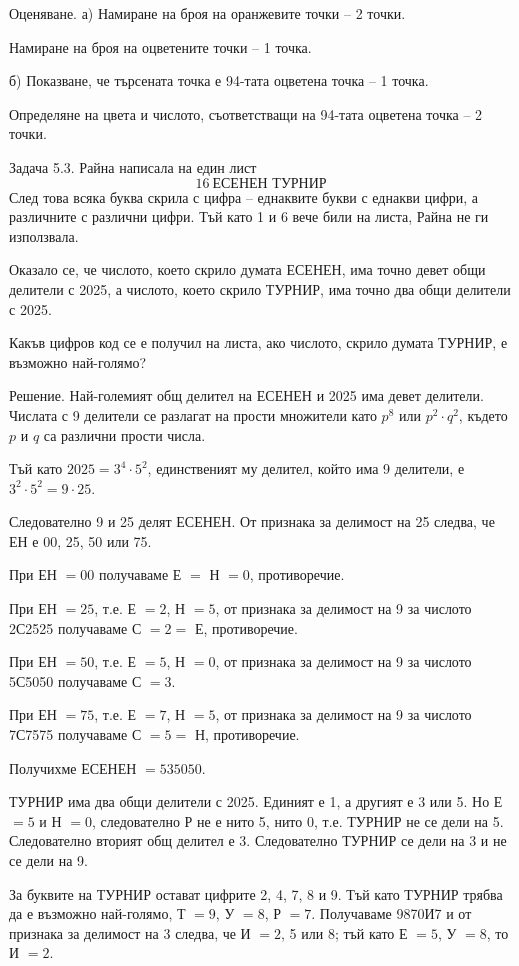 Оценяване. а) Намиране на броя на оранжевите точки – 2 точки.

Намиране на броя на оцветените точки – 1 точка.

б) Показване, че търсената точка е 94-тата оцветена точка – 1 точка.

Определяне на цвета и числото, съответстващи на 94-тата оцветена точка – 2 точки.

Задача 5.3. Райна написала на един лист
$$16\ \text{ЕСЕНЕН ТУРНИР}$$
След това всяка буква скрила с цифра – еднаквите букви с еднакви цифри, а различните с различни цифри. Тъй като 1 и 6 вече били на листа, Райна не ги използвала.

Оказало се, че числото, което скрило думата ЕСЕНЕН, има точно девет общи делители с 2025, а числото, което скрило ТУРНИР, има точно два общи делители с 2025.

Какъв цифров код се е получил на листа, ако числото, скрило думата ТУРНИР, е възможно най-голямо?

Решение. Най-големият общ делител на ЕСЕНЕН и 2025 има девет делители. Числата с 9 делители се разлагат на прости множители като $p^8$ или $p^2\cdot q^2$, където $p$ и $q$ са различни прости числа.

Тъй като $2025=3^4\cdot5^2$, единственият му делител, който има 9 делители, е $3^2\cdot5^2=9\cdot25$.

Следователно 9 и 25 делят ЕСЕНЕН. От признака за делимост на 25 следва, че ЕН е 00, 25, 50 или 75.

При ЕН $=00$ получаваме Е $=$ Н $=0$, противоречие.

При ЕН $=25$, т.е. Е $=2$, Н $=5$, от признака за делимост на 9 за числото 2С2525 получаваме С $=2=$ Е, противоречие.

При ЕН $=50$, т.е. Е $=5$, Н $=0$, от признака за делимост на 9 за числото 5С5050 получаваме С $=3$.

При ЕН $=75$, т.е. Е $=7$, Н $=5$, от признака за делимост на 9 за числото 7С7575 получаваме С $=5=$ Н, противоречие.

Получихме ЕСЕНЕН $=535050$.

ТУРНИР има два общи делители с 2025. Единият е 1, а другият е 3 или 5. Но Е $=5$ и Н $=0$, следователно Р не е нито 5, нито 0, т.е. ТУРНИР не се дели на 5. Следователно вторият общ делител е 3. Следователно ТУРНИР се дели на 3 и не се дели на 9.

За буквите на ТУРНИР остават цифрите 2, 4, 7, 8 и 9. Тъй като ТУРНИР трябва да е възможно най-голямо, Т $=9$, У $=8$, Р $=7$. Получаваме 9870И7 и от признака за делимост на 3 следва, че И $=2$, 5 или 8; тъй като Е $=5$, У $=8$, то И $=2$.

